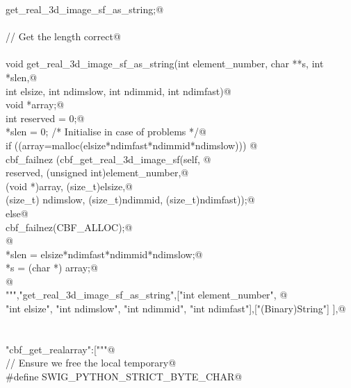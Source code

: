 \documentclass[10pt,a4paper,twoside,notitlepage]{article}
\begin{document}
\begin{flushleft}
\begin{minipage}{\linewidth}
\begin{list}{}{}
\mbox{}\verb@       get_real_3d_image_sf_as_string;@\\
\mbox{}\verb@@\\
\mbox{}\verb@// Get the length correct@\\
\mbox{}\verb@@\\
\mbox{}\verb@    void get_real_3d_image_sf_as_string(int element_number, char **s, int *slen,@\\
\mbox{}\verb@    int elsize, int ndimslow, int ndimmid, int ndimfast){@\\
\mbox{}\verb@        void *array;@\\
\mbox{}\verb@        int reserved = 0;@\\
\mbox{}\verb@        *slen = 0; /* Initialise in case of problems */@\\
\mbox{}\verb@        if ((array=malloc(elsize*ndimfast*ndimmid*ndimslow))) {@\\
\mbox{}\verb@               cbf_failnez (cbf_get_real_3d_image_sf(self, @\\
\mbox{}\verb@               reserved, (unsigned int)element_number,@\\
\mbox{}\verb@               (void *)array, (size_t)elsize,@\\
\mbox{}\verb@               (size_t) ndimslow, (size_t)ndimmid, (size_t)ndimfast));@\\
\mbox{}\verb@         }else{@\\
\mbox{}\verb@               cbf_failnez(CBF_ALLOC);@\\
\mbox{}\verb@         }@\\
\mbox{}\verb@        *slen = elsize*ndimfast*ndimmid*ndimslow;@\\
\mbox{}\verb@        *s = (char *) array;@\\
\mbox{}\verb@      }@\\
\mbox{}\verb@""","get_real_3d_image_sf_as_string",["int element_number", @\\
\mbox{}\verb@    "int elsize", "int ndimslow", "int ndimmid", "int ndimfast"],["(Binary)String"] ],@\\
\mbox{}\verb@@\\
\mbox{}\verb@@\\
\mbox{}\verb@"cbf_get_realarray":["""@\\
\mbox{}\verb@// Ensure we free the local temporary@\\
\mbox{}\verb@%{@\\
\mbox{}\verb@#define SWIG_PYTHON_STRICT_BYTE_CHAR@\\
\mbox{}\verb@%}@\\

\end{list}
\end{minipage}
\end{flushleft}
\end{document}
